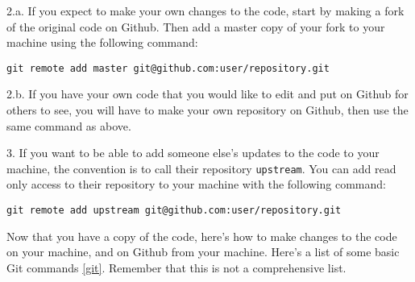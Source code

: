 \documentclass{article}
\begin{document}
2.a. If you expect to make your own changes to the code, start by making
a fork of the original code on Github. Then add a master copy of your
fork to your machine using the following command:
\begin{verbatim}
git remote add master git@github.com:user/repository.git
\end{verbatim}
2.b. If you have your own code that you would like to edit and put on
Github for others to see, you will have to make your own repository on
Github, then use the same command as above.

3. If you want to be able to add someone else's updates to the code to
your machine, the convention is to call their repository
\verb|upstream|. You can add read only access to their repository to
your machine with the following command:
\begin{verbatim}
git remote add upstream git@github.com:user/repository.git
\end{verbatim}

Now that you have a copy of the code, here's how to make changes to
the code on your machine, and on Github from your machine. Here's a
list of some basic Git commands \ref{git}. Remember that this is not a
comprehensive list.
\end{document}
